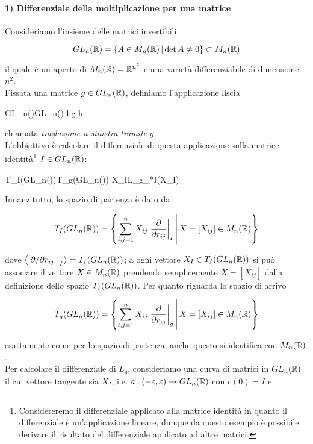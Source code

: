 \paragraph{1) Differenziale della moltiplicazione per una matrice}\label{trasl-diff}

Consideriamo l'insieme delle matrici invertibili

\begin{equation}
	GL_{n}(\mathbb{R}) = \left\{ A \in M_{n}(\mathbb{R}) \, \middle| \, \det A \neq 0 \right\} \subset M_{n}(\mathbb{R})
\end{equation}

il quale è un aperto di $ M_{n}(\mathbb{R}) = \mathbb{R}^{n^{2}} $ e una varietà differenziabile di dimensione $ n^{2} $.\\
Fissata una matrice $ g \in GL_{n}(\mathbb{R}) $, definiamo l'applicazione liscia

	{GL_{n}(\R)}{GL_{n}(\R)}
	{h}{g h}

chiamata \textit{traslazione a sinistra tramite} $ g $.\\
L'obbiettivo è calcolare il differenziale di questa applicazione sulla matrice identità\footnote{%
	Considereremo il differenziale applicato alla matrice identità in quanto il differenziale è un'applicazione lineare, dunque da questo esempio è possibile derivare il risultato del differenziale applicato ad altre matrici.%
} $ I \in GL_{n}(\mathbb{R}) $:

	{T_{I}(GL_{n}(\R))}{T_{g}(GL_{n}(\R))}
	{X_{I}}{L_{g_{*I}}(X_{I})}

Innanzitutto, lo spazio di partenza è dato da

\begin{equation}
	T_{I}(GL_{n}(\R)) = \left\{ \sum_{i,j=1}^{n} X_{ij} \eval{ \pdv{r_{ij}} }_{I} \st X=[X_{ij}] \in M_{n}(\R) \right\}
\end{equation}

dove $ \ev{ \eval{ \pdv*{r_{ij}} }_{I} } = T_{I}(GL_{n}(\R)) $; a ogni vettore $ X_{I} \in T_{I}(GL_{n}(\mathbb{R})) $ si può associare il vettore $ X \in M_{n}(\mathbb{R}) $ prendendo semplicemente $ X=[X_{ij}] $ dalla definizione dello spazio $ T_{I}(GL_{n}(\mathbb{R})) $. Per quanto riguarda lo spazio di arrivo

\begin{equation}
	T_{g}(GL_{n}(\R)) = \left\{ \sum_{i,j=1}^{n} X_{ij} \eval{ \pdv{r_{ij}} }_{g} \st X=[X_{ij}] \in M_{n}(\R) \right\}
\end{equation}

esattamente come per lo spazio di partenza, anche questo si identifica con $ M_{n}(\mathbb{R}) $.\\
Per calcolare il differenziale di $ L_{g} $, consideriamo una curva di matrici in $ GL_{n}(\mathbb{R}) $ il cui vettore tangente sia $ X_{I} $, i.e. $ c : (-\varepsilon,\varepsilon) \to GL_{n}(\mathbb{R}) $ con $ c(0)=I $ e 

